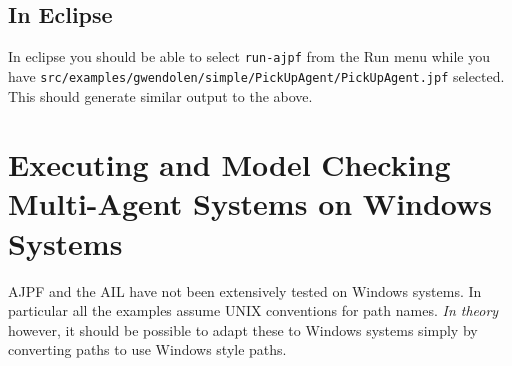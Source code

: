 \subsection{In Eclipse}

In eclipse you should be able to select \texttt{run-ajpf} from the Run menu while you have \texttt{src/examples/gwendolen/simple/PickUpAgent/PickUpAgent.jpf} selected.  This should generate similar output to the above.

\section{Executing and Model Checking Multi-Agent Systems on Windows Systems}

AJPF and the AIL have not been extensively tested on Windows systems.  In particular all the examples assume UNIX conventions for path names.  \emph{In theory} however, it should be possible to adapt these to Windows systems simply by converting paths to use Windows style paths.
